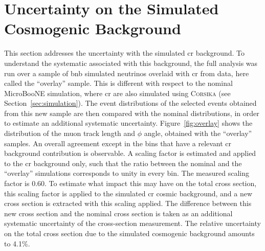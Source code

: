 \section[Uncertainty on Simulated Cosmics]{Uncertainty on the Simulated Cosmogenic Background}
\label{sec:error_cosmic}

This section addresses the uncertainty with the simulated \acrshort{cr} background. To understand the systematic associated with this background, the full analysis was run over a sample of \acrshort{bnb} simulated neutrinos overlaid with \acrshort{cr} from data, here called the ``overlay'' sample. This is different with respect to the nominal MicroBooNE simulation, where \acrshort{cr} are also simulated using \textsc{Corsika} (see Section~\ref{sec:simulation}). The event distributions of the selected events obtained from this new sample are then compared with the nominal distributions, in order to estimate an additional systematic uncertainty. Figure~\ref{fig:overlay} shows the distribution of the muon track length and $\phi$ angle, obtained with the ``overlay'' samples. 
An overall agreement except in the bins that have a relevant \acrshort{cr} background contribution is observable. 
A scaling factor is estimated and applied to the \acrshort{cr} background only, such that the ratio between the nominal and the ``overlay'' simulations corresponds to unity in every bin. The measured scaling factor is 0.60. To estimate what impact this may have on the total cross section, this scaling factor is applied to the simulated \acrshort{cr} cosmic background, and a new cross section is extracted with this scaling applied. The difference between this new cross section and the nominal cross section is taken as an additional systematic uncertainty of the cross-section measurement. 
The relative uncertainty on the total cross section due to the simulated cosmogenic background amounts to 4.1\%.




